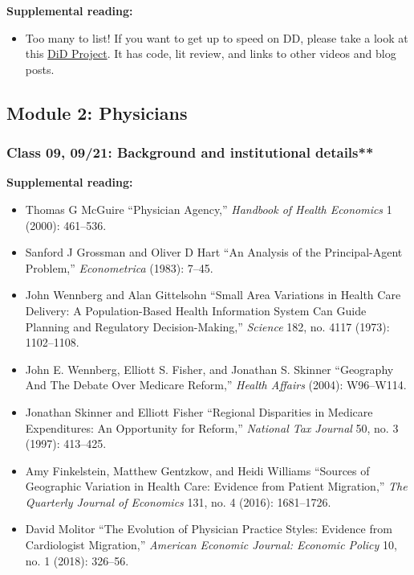 \documentclass[11pt,]{article}
\providecommand{\tightlist}{%
  \setlength{\itemsep}{0pt}\setlength{\parskip}{0pt}}
\begin{document}
\textbf{Supplemental reading:}

\begin{itemize}
\tightlist
\item
  Too many to list! If you want to get up to speed on DD, please take a
  look at this
  \href{https://asjadnaqvi.github.io/DiD/docs/reading/04_literature/}{DiD
  Project}. It has code, lit review, and links to other videos and blog
  posts.
\end{itemize}

\hypertarget{module-2-physicians}{%
\subsection{Module 2: Physicians}\label{module-2-physicians}}

\hypertarget{class-09-0921-background-and-institutional-details}{%
\subsubsection{Class 09, 09/21: Background and institutional
details**}\label{class-09-0921-background-and-institutional-details}}

\textbf{Supplemental reading:}

\begin{itemize}
\tightlist
\item
  Thomas G McGuire {``Physician Agency,''} \emph{Handbook of Health
  Economics} 1 (2000): 461--536.
\item
  Sanford J Grossman and Oliver D Hart {``An Analysis of the
  Principal-Agent Problem,''} \emph{Econometrica} (1983): 7--45.
\item
  John Wennberg and Alan Gittelsohn {``Small Area Variations in Health
  Care Delivery: A Population-Based Health Information System Can Guide
  Planning and Regulatory Decision-Making,''} \emph{Science} 182, no.
  4117 (1973): 1102--1108.
\item
  John E. Wennberg, Elliott S. Fisher, and Jonathan S. Skinner
  {``Geography {And} {The} {Debate} {Over} {Medicare} {Reform},''}
  \emph{Health Affairs} (2004): W96--W114.
\item
  Jonathan Skinner and Elliott Fisher {``Regional Disparities in
  {Medicare} Expenditures: An Opportunity for Reform,''} \emph{National
  Tax Journal} 50, no. 3 (1997): 413--425.
\item
  Amy Finkelstein, Matthew Gentzkow, and Heidi Williams {``Sources of
  Geographic Variation in Health Care: {Evidence} from Patient
  Migration,''} \emph{The Quarterly Journal of Economics} 131, no. 4
  (2016): 1681--1726.
\item
  David Molitor {``The Evolution of Physician Practice Styles: Evidence
  from Cardiologist Migration,''} \emph{American Economic Journal:
  Economic Policy} 10, no. 1 (2018): 326--56.
\end{itemize}
\end{document}
